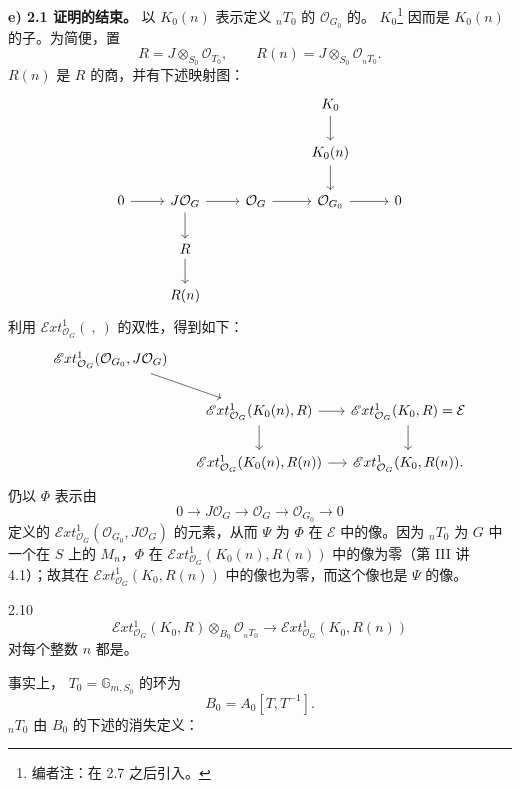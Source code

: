 \textbf{e)  2.1 证明的结束。}
以 $K_0(n)$ 表示定义 ${}_nT_0$ 的 $\mathcal O_{G_0}$ 的。 $K_0$\footnote{编者注：在 2.7 之后引入。} 因而是 $K_0(n)$ 的子。为简便，置
\[R=J\otimes_{S_0}\mathcal O_{T_0},\qquad R(n)=J\otimes_{S_0}\mathcal O_{{}_nT_0}.\]
 $R(n)$ 是 $R$ 的商，并有下述映射图：
\[
\begin{tikzcd}
&&&K_0\arrow[d]\\
&&&K_0(n)\arrow[d]\\
0\arrow[r]&J\mathcal O_G\arrow[r]\arrow[d]&\mathcal O_G\arrow[r]&\mathcal O_{G_0}\arrow[r]&0\\
&R\arrow[d]&&\\
&R(n)&&
\end{tikzcd}
\]
利用 $\mathscr Ext^1_{\mathcal O_G}(\ ,\ )$ 的双性，得到如下：
\[
\begin{tikzcd}[column sep=small]
\mathscr Ext^1_{\mathcal O_G}(\mathcal O_{G_0},J\mathcal O_G)\arrow[dr]&&\\
&\mathscr Ext^1_{\mathcal O_G}(K_0(n),R)\arrow[r]\arrow[d]&\mathscr Ext^1_{\mathcal O_G}(K_0,R)=\mathcal E\arrow[d]\\
&\mathscr Ext^1_{\mathcal O_G}(K_0(n),R(n))\arrow[r]&\mathscr Ext^1_{\mathcal O_G}(K_0,R(n)).
\end{tikzcd}
\]
仍以 $\Phi$ 表示由
\[0\longrightarrow J\mathcal O_G\longrightarrow\mathcal O_G\longrightarrow\mathcal O_{G_0}\longrightarrow0\]
定义的 $\mathscr Ext^1_{\mathcal O_G}(\mathcal O_{G_0},J\mathcal O_G)$ 的元素，从而 $\Psi$ 为 $\Phi$ 在 $\mathcal E$ 中的像。因为 ${}_nT_0$ 为 $G$ 中一个在 $S$ 上的 $M_n$，$\Phi$ 在 $\mathscr Ext^1_{\mathcal O_G}(K_0(n),R(n))$ 中的像为零（第 III 讲 4.1）；故其在 $\mathscr Ext^1_{\mathcal O_G}(K_0,R(n))$ 中的像也为零，而这个像也是 $\Psi$ 的像。
\begin{SGAresult}{}{2.10}
\[\mathscr Ext^1_{\mathcal O_G}(K_0,R)\otimes_{B_0}\mathcal O_{{}_nT_0}\longrightarrow\mathscr Ext^1_{\mathcal O_G}(K_0,R(n))\]
对每个整数 $n$ 都是。
\end{SGAresult}
事实上， $T_0=\mathbb G_{m,S_0}$ 的环为
\[B_0=A_0[T,T^{-1}].\]
 ${}_nT_0$ 由 $B_0$ 的下述的消失定义：
